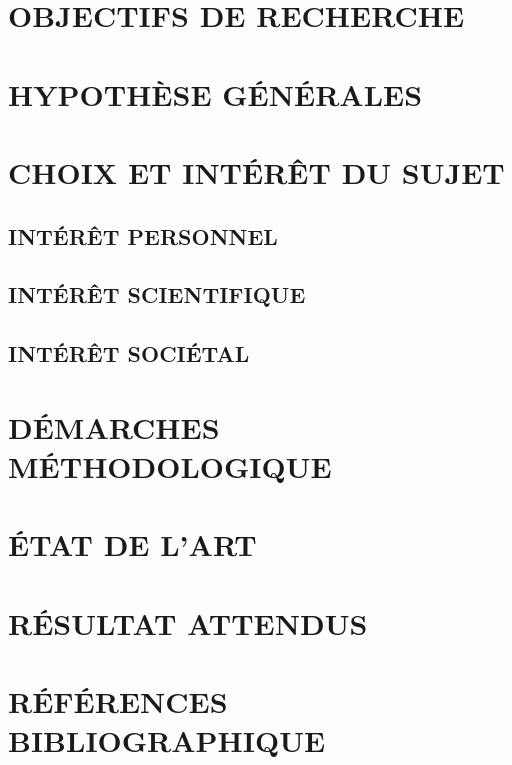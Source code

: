 \documentclass[a4paper,12pt,oneside]{book}
\begin{document}
\section[Objectifs de recherche]{OBJECTIFS DE RECHERCHE}

\section[Hyposthèses générales]{HYPOTHÈSE GÉNÉRALES}
\section[Choix et interet du sujet]{CHOIX ET INTÉRÊT DU SUJET}
\subsection[short]{INTÉRÊT PERSONNEL}

\subsection[short]{INTÉRÊT SCIENTIFIQUE}

\subsection[short]{INTÉRÊT SOCIÉTAL}

\section[Démarches méthodologiques]{DÉMARCHES MÉTHODOLOGIQUE}

\section[Etat de l'art]{ÉTAT DE L’ART}

\section[Résultats attenus]{RÉSULTAT ATTENDUS}

\section[Références bibliographiques]{RÉFÉRENCES BIBLIOGRAPHIQUE}
\printbibliography
\end{document}
